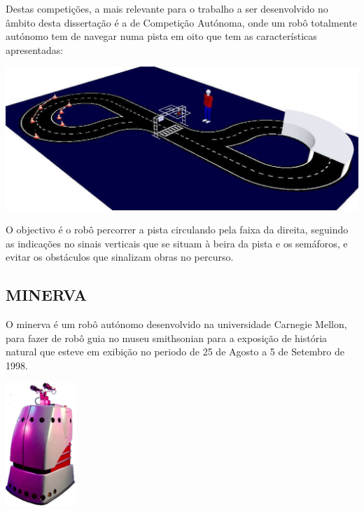 Destas competições, a mais relevante para o trabalho a ser desenvolvido no 
âmbito desta dissertação é a de Competição Autónoma, onde um robô totalmente 
autónomo tem de navegar numa pista em oito que tem as características apresentadas:

\begin{center}
	\includegraphics[width=1.00\textwidth]{figures/ca_pista.png}
	\label{fig:3}
\end{center}

O objectivo é o robô percorrer a pista circulando pela faixa da direita, seguindo
as indicações no sinais verticais que se situam à beira da pista e os semáforos,
e evitar os obstáculos que sinalizam obras no percurso.


\subsection{MINERVA}
O minerva é um robô autónomo desenvolvido na universidade Carnegie Mellon, para
fazer de robô guia no museu smithsonian para a exposição de história natural que
esteve em exibição no periodo de 25 de Agosto a 5 de Setembro de 1998.

\begin{center}
	\includegraphics[width=0.20\textwidth]{figures/minerva.png}
	\label{fig:4}
\end{center}

